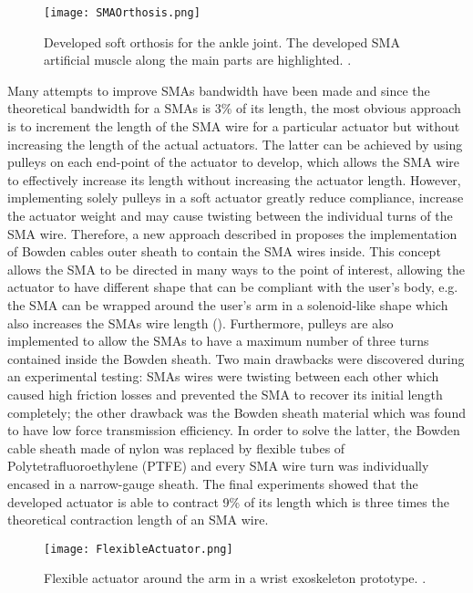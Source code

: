 \begin{figure}[hbtp!]
    \centering
    \texttt{[image: SMAOrthosis.png]}
    \caption{Developed soft orthosis for the ankle joint. The developed SMA artificial muscle along the main parts are highlighted. \cite{Zhang2013a}. }
    \label{fig:SMA_orthosis}
\end{figure}

Many attempts to improve SMAs bandwidth have been made and since the theoretical bandwidth for a SMAs is 3\% of its length, the most obvious approach is to increment the length of the SMA wire for a particular actuator but without increasing the length of the actual actuators. The latter can be achieved by using pulleys on each end-point of the actuator to develop, which allows the SMA wire to effectively increase its length without increasing the actuator length. However, implementing solely pulleys in a soft actuator greatly reduce compliance, increase the actuator weight and may cause twisting between the individual turns of the SMA wire. Therefore, a new approach described in \cite{Villoslada2015} proposes the implementation of Bowden cables outer sheath to contain the SMA wires inside. This concept allows the SMA to be directed in many ways to the point of interest, allowing the actuator to have different shape that can be compliant with the user's body, e.g. the SMA can be wrapped around the user's arm in a solenoid-like shape which also increases the SMAs wire length (). Furthermore, pulleys are also implemented to allow the SMAs to have a maximum number of three turns contained inside the Bowden sheath. Two main drawbacks were discovered during an experimental testing: SMAs wires were twisting between each other which caused high friction losses and prevented the SMA to recover its initial length completely; the other drawback was the Bowden sheath material which was found to have low force transmission efficiency. In order to solve the latter, the Bowden cable sheath made of nylon was replaced by flexible tubes of Polytetrafluoroethylene (PTFE) and every SMA wire turn was individually encased in a narrow-gauge sheath. The final experiments showed that the developed actuator is able to contract 9\% of its length which is three times the theoretical contraction length of an SMA wire.

\begin{figure}[hbtp!]
    \centering
    \texttt{[image: FlexibleActuator.png]}
    \caption{Flexible actuator around the arm in a wrist exoskeleton prototype. \cite{Villoslada2015}. }
    \label{fig:flexible_actuator}
\end{figure}

